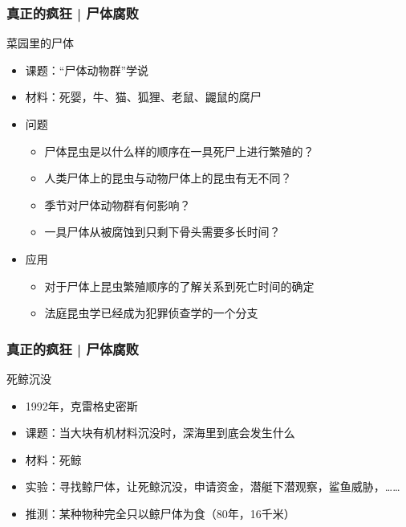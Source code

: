 \begin{frame}
  \frametitle{真正的疯狂 | 尸体腐败}
  \begin{block}{菜园里的尸体}
    \begin{itemize}
      \item 课题：“尸体动物群”学说
      \item 材料：死婴，牛、猫、狐狸、老鼠、鼹鼠的腐尸
      \item 问题
        \begin{itemize}
          \item 尸体昆虫是以什么样的顺序在一具死尸上进行繁殖的？
          \item 人类尸体上的昆虫与动物尸体上的昆虫有无不同？
          \item 季节对尸体动物群有何影响？
          \item 一具尸体从被腐蚀到只剩下骨头需要多长时间？
        \end{itemize}
      \item 应用
        \begin{itemize}
          \item 对于尸体上昆虫繁殖顺序的了解关系到死亡时间的确定
          \item 法庭昆虫学已经成为犯罪侦查学的一个分支
        \end{itemize}
    \end{itemize}
  \end{block}
\end{frame}

\begin{frame}
  \frametitle{真正的疯狂 | 尸体腐败}
  \begin{block}{死鲸沉没}
    \begin{itemize}
      \item 1992年，克雷格\textbullet 史密斯
      \item 课题：当大块有机材料沉没时，深海里到底会发生什么
      \item 材料：死鲸
      \item 实验：寻找鲸尸体，让死鲸沉没，申请资金，潜艇下潜观察，鲨鱼威胁，……
      \item 推测：某种物种完全只以鲸尸体为食（80年，16千米）
    \end{itemize}
  \end{block}
\end{frame}

